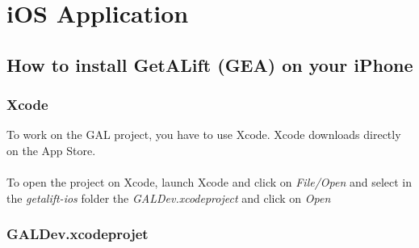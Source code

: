 \chapter{iOS Application}

\section{How to install GetALift (GEA) on your iPhone}

\subsection{Xcode}

To work on the GAL project, you have to use Xcode. Xcode downloads directly on the App Store.
\\\\
To open the project on Xcode, launch Xcode and click on \textit{File/Open} and select in the  \textit{getalift-ios} folder the \textit{GALDev.xcodeproject} and click on \textit{Open}

\subsection{GALDev.xcodeprojet}

